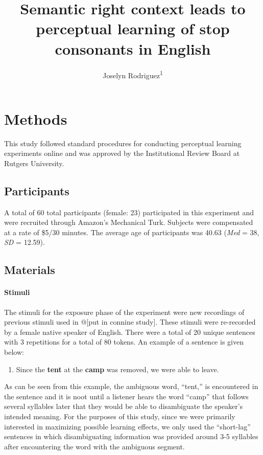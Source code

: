 \documentclass[
  english,
  man]{apa6}
\title{Semantic right context leads to perceptual learning of stop consonants in English}
\author{Joselyn Rodriguez\textsuperscript{1}}
\date{}
\affiliation{\phantom{0}}
\providecommand{\tightlist}{%
  \setlength{\itemsep}{0pt}\setlength{\parskip}{0pt}}
\let\oldparagraph\paragraph
\renewcommand{\paragraph}[1]{\oldparagraph{#1}\mbox{}}
\begin{document}
\maketitle

\hypertarget{methods}{%
\section{Methods}\label{methods}}

This study followed standard procedures for conducting perceptual learning experiments online and was approved by the Institutional Review Board at Rutgers University.

\hypertarget{participants}{%
\subsection{Participants}\label{participants}}

A total of 60 total participants (female: 23) participated in this experiment and were recruited through Amazon's Mechanical Turk. Subjects were compensated at a rate of \$5/30 minutes. The average age of participants was 40.63 (\emph{Med} = 38, \emph{SD} = 12.59).

\hypertarget{materials}{%
\subsection{Materials}\label{materials}}

\hypertarget{stimuli}{%
\paragraph{Stimuli}\label{stimuli}}

The stimuli for the exposure phase of the experiment were new recordings of previous stimuli used in @{[}put in connine study{]}. These stimuli were re-recorded by a female native speaker of English. There were a total of 20 unique sentences with 3 repetitions for a total of 80 tokens. An example of a sentence is given below:

\begin{enumerate}
\def\labelenumi{(\arabic{enumi})}
\tightlist
\item
  Since the \textbf{tent} at the \textbf{camp} was removed, we were able to leave.
\end{enumerate}

As can be seen from this example, the ambiguous word, ``tent,'' is encountered in the sentence and it is noot until a listener hears the word ``camp'' that follows several syllables later that they would be able to disambiguate the speaker's intended meaning. For the purposes of this study, since we were primarily interested in maximizing possible learning effects, we only used the ``short-lag'' sentences in which disambiguating information was provided around 3-5 syllables after encountering the word with the ambiguous segment.
\end{document}
